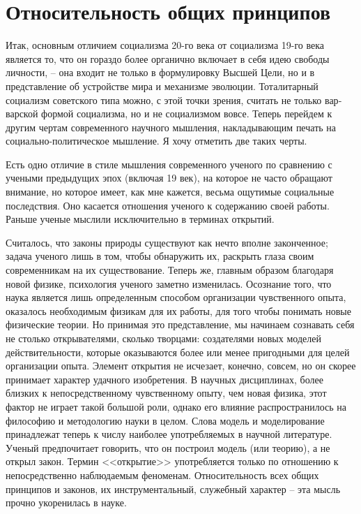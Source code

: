 \documentclass{book}
\begin{document}
\section{Относительность общих принципов}

Итак, основным отличием социализма 20-го века от социа­лизма 19-го века является то, что он гораздо более органично включает в себя идею свободы личности, -- она входит не только в формулировку Высшей Цели, но и в представление об устрой­стве мира и механизме эволюции. Тоталитарный социализм со­ветского типа можно, с этой точки зрения, считать не только вар­варской формой социализма, но и не социализмом вовсе. Теперь перейдем к другим чертам современного научного мышления, накладывающим печать на социально-политическое мышление. Я хочу отметить две таких черты.

Есть одно отличие в стиле мышления современного ученого по сравнению с учеными предыдущих эпох (включая 19 век), на которое не часто обращают внимание, но которое имеет, как мне кажется, весьма ощутимые социальные последствия. Оно касается отношения ученого к содержанию своей работы. Раньше ученые мыслили исключительно в терминах открытий. 

Считалось, что законы природы существуют как нечто вполне законченное; задача ученого лишь в том, чтобы обнаружить их, раскрыть глаза своим современникам на их существование. Теперь же, главным образом благодаря новой физике, психо­логия ученого заметно изменилась. Осознание того, что наука является лишь определенным способом организации чувственного опыта, оказалось необходимым физикам для их работы, для того чтобы понимать новые физические теории. Но прини­мая это представление, мы начинаем сознавать себя не столько открывателями, сколько творцами: создателями новых моде­лей действительности, которые оказываются более или менее пригодными для целей организации опыта. Элемент открытия не исчезает, конечно, совсем, но он скорее принимает характер удачного изобретения.  В научных дисциплинах, более близких к непосредственному чувственному опыту, чем новая физика, этот фактор не играет такой большой роли, однако его влияние распространилось на философию и методологию науки в целом. Слова модель  и 
моделирование  принадлежат теперь к числу наиболее употребляемых в научной литературе. Ученый пред­почитает говорить, что он построил модель (или теорию),  а не открыл закон.  Термин <<открытие>> употребляется только по от­ношению к непосредственно наблюдаемым феноменам. Относи­тельность всех общих принципов и законов, их инструменталь­ный, служебный характер -- эта мысль прочно укоренилась в науке.
\end{document}
